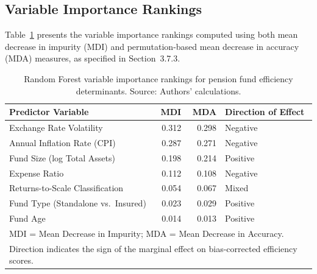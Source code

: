 \documentclass[12pt,a4paper]{article}
\begin{document}
\subsection{Variable Importance Rankings}

Table~\ref{tab:rf_importance} presents the variable importance rankings computed using both mean decrease in impurity (MDI) and permutation-based mean decrease in accuracy (MDA) measures, as specified in Section~3.7.3.

\begin{table}[H]
\centering
\caption{Random Forest variable importance rankings for pension fund efficiency determinants. Source: Authors' calculations.}
\label{tab:rf_importance}
\begin{tabular}{lrrl}
\toprule
\textbf{Predictor Variable} & \textbf{MDI} & \textbf{MDA} & \textbf{Direction of Effect} \\
\midrule
Exchange Rate Volatility              & 0.312 & 0.298 & Negative \\
Annual Inflation Rate (CPI)           & 0.287 & 0.271 & Negative \\
Fund Size (log Total Assets)          & 0.198 & 0.214 & Positive \\
Expense Ratio                         & 0.112 & 0.108 & Negative \\
Returns-to-Scale Classification       & 0.054 & 0.067 & Mixed \\
Fund Type (Standalone vs.\ Insured)   & 0.023 & 0.029 & Positive \\
Fund Age                              & 0.014 & 0.013 & Positive \\
\bottomrule
\multicolumn{4}{l}{\footnotesize MDI = Mean Decrease in Impurity; MDA = Mean Decrease in Accuracy.} \\
\multicolumn{4}{l}{\footnotesize Direction indicates the sign of the marginal effect on bias-corrected efficiency scores.}
\end{tabular}
\end{table}
\end{document}
